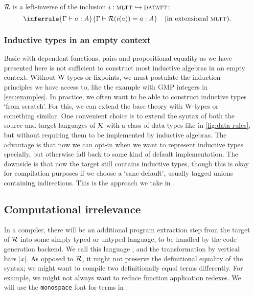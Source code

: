\begin{theorem}
    $\mathcal{R}$ is a left-inverse of the inclusion $i : {\textsc{mltt}}
    \hookrightarrow {\textsc{datatt}}$:
    \[
    \inferrule{\Gamma \vdash a : A}{\Gamma \vdash \R(i(a)) = a : A} \quad \text{(in extensional \lambdamltt)}.
    \]
\end{theorem}

\subsubsection{Inductive types in an empty context}

Basic \lambdamltt with dependent functions, pairs and propositional equality as
we have presented here is not sufficient to construct most inductive algebras in
an empty context. Without W-types or fixpoints, we must postulate the induction
principles we have access to, like the example with GMP integers in
\cref{sec:examples}. In practice, we often want to be able to construct
inductive types `from scratch'. For this, we can extend the base theory
with W-types or something similar. One convenient choice is to extend
the syntax of both the source and target languages of $\mathcal{R}$ with a class of data
types like in \cref{fig:data-rules}, but without requiring them to be
implemented by inductive algebras. The advantage is that now we can opt-in when
we want to represent inductive types specially, but otherwise fall back to some
kind of default implementation. The downside is that now the target still
contains inductive types, though this is okay for compilation purposes if we
choose a `sane default', usually tagged unions containing indirections. This is
the approach we take in \superfluid.

\subsection{Computational irrelevance}\label{sub:irr}

In a compiler, there will be an additional program extraction step from the
target of $\mathcal{R}$ into some simply-typed or untyped language, to be handled by the
code-generation backend. We call this language \lambdaprog, and the transformation by
vertical bars $|x|$. As opposed to $\mathcal{R}$, it might not preserve the definitional
equality of the syntax; we might want to compile two definitionally equal terms
differently. For example, we might not always want to reduce function
application redexes. We will use the \texttt{monospace} font for terms in
\lambdaprog.

